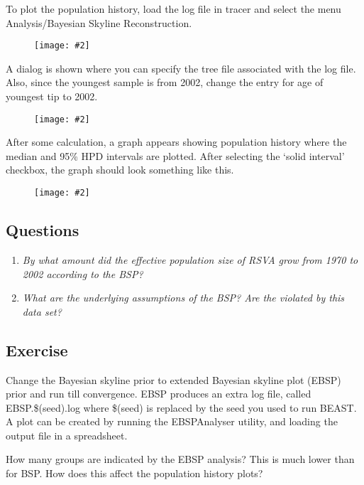 \documentclass[12pt]{article}
\newcommand{\includeimage}[2][]{%
\texttt{[image: \#2]}
}
\begin{document}
To plot the population history, load the log file in tracer and select the menu 
Analysis/Bayesian Skyline Reconstruction.

\begin{figure}
\centering	
\includeimage[scale=0.5,clip=true,trim=0 300 0 0]{figures/tracerBSP1}
\label{fig:tracerBSP1}
\end{figure}

A dialog is shown where you can specify the tree file associated with the log file.
Also, since the youngest sample is from 2002, change the entry for age of youngest
tip to 2002.

\begin{figure}
\centering	
\includeimage[width=0.6\textwidth]{figures/tracerBSP2}
\label{fig:tracerBSP2}
\end{figure}

After some calculation, a graph appears showing population history where the median
and 95\% HPD intervals are plotted. After selecting the `solid interval' checkbox, the
graph should look something like this.

\begin{figure}
\centering	
\includeimage[width=0.7\textwidth]{figures/tracerBSP3}
\label{fig:tracerBSP3}
\end{figure}


\subsection*{Questions}
\begin{enumerate}
\item \textit{By what amount did the effective population size of RSVA grow from 1970 to 2002 according to the BSP?}
 

\item \textit{What are the underlying assumptions of the BSP? Are the violated by this data set?}
 
\end{enumerate}


\subsection{Exercise}
Change the Bayesian skyline prior to extended Bayesian skyline plot (EBSP) prior and run
till convergence. EBSP produces an extra log file, called EBSP.\$(seed).log where \$(seed)
is replaced by the seed you used to run BEAST.
A plot can be created by running the EBSPAnalyser utility, and loading the output file
in a spreadsheet.

How many groups are indicated by the EBSP analysis?
This is much lower than for BSP. How does this affect the population history plots?

 

\end{document}
